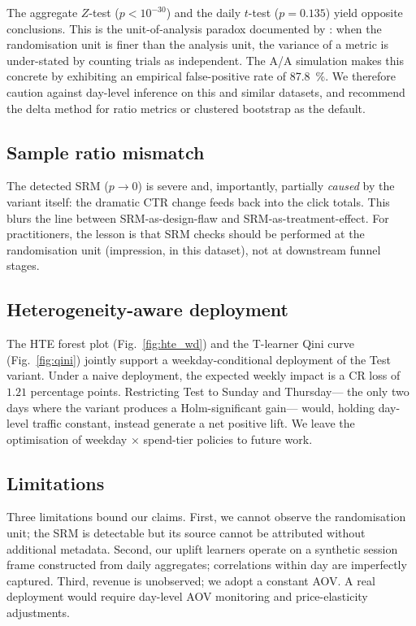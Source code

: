 \documentclass[pdflatex,sn-mathphys-num]{sn-jnl}
\theoremstyle{thmstyleone}
\theoremstyle{thmstyletwo}
\theoremstyle{thmstylethree}
\begin{document}
The aggregate $Z$-test ($p<10^{-30}$) and the daily $t$-test ($p=0.135$) yield
opposite conclusions. This is the unit-of-analysis paradox documented by
\cite{larsen2024statistical}: when the randomisation unit is finer than the
analysis unit, the variance of a metric is under-stated by counting trials
as independent. The A/A simulation makes this concrete by exhibiting an
empirical false-positive rate of \SI{87.8}{\percent}.
We therefore caution against day-level inference on this and similar datasets,
and recommend the delta method for ratio metrics \cite{deng2018applying} or
clustered bootstrap as the default.

\subsection{Sample ratio mismatch}\label{subsec:disc-srm}

The detected SRM ($p\to 0$) is severe and, importantly, partially \emph{caused} by
the variant itself: the dramatic CTR change feeds back into the click totals.
This blurs the line between SRM-as-design-flaw and SRM-as-treatment-effect.
For practitioners, the lesson is that SRM checks should be performed at the
randomisation unit (impression, in this dataset), not at downstream funnel stages.

\subsection{Heterogeneity-aware deployment}\label{subsec:disc-deploy}

The HTE forest plot (Fig.~\ref{fig:hte_wd}) and the T-learner Qini curve
(Fig.~\ref{fig:qini}) jointly support a weekday-conditional deployment of the Test variant.
Under a naive deployment, the expected weekly impact is a CR loss of
$1.21$ percentage points. Restricting Test to Sunday and Thursday—%
the only two days where the variant produces a Holm-significant gain—%
would, holding day-level traffic constant, instead generate a net positive lift.
We leave the optimisation of weekday × spend-tier policies to future work.

\subsection{Limitations}\label{subsec:disc-lim}

Three limitations bound our claims.
First, we cannot observe the randomisation unit; the SRM is detectable
but its source cannot be attributed without additional metadata.
Second, our uplift learners operate on a synthetic session frame
constructed from daily aggregates; correlations within day are imperfectly captured.
Third, revenue is unobserved; we adopt a constant AOV. A real deployment would
require day-level AOV monitoring and price-elasticity adjustments.
\end{document}
